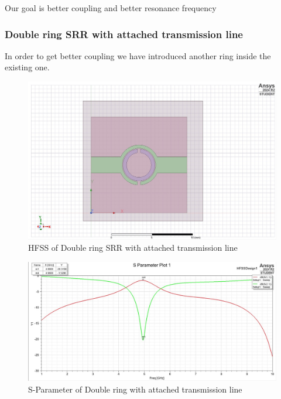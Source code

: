 \documentclass[conference]{IEEEtran}
\begin{document}
Our goal is better coupling and better resonance frequency 


\subsubsection{Double ring SRR with attached transmission line}
In order to get better coupling we have introduced another ring inside the existing one.

\begin{figure}[h]
    \centering
    \includegraphics[width=1\linewidth]{Images/WhatsApp Image 2025-05-05 at 21.11.26_959ad83c.jpg}
    \caption{HFSS of Double ring SRR with attached transmission line}
\end{figure}
\begin{figure}
    \centering
    \includegraphics[width=1\linewidth]{Images/WhatsApp Image 2025-05-05 at 21.13.55_aaad92d6.jpg}
    \caption{S-Parameter of Double ring with attached transmission line}
\end{figure}
\end{document}
